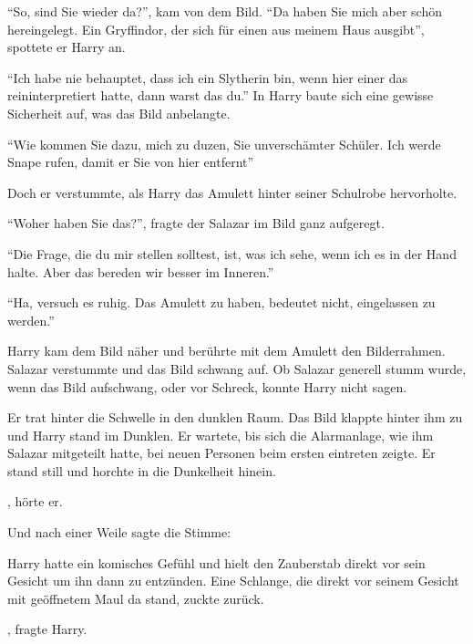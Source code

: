 \enquote{So, sind Sie wieder da?}, kam von dem Bild. \enquote{Da haben Sie mich aber schön hereingelegt. Ein Gryffindor, der sich für einen aus meinem Haus ausgibt}, spottete er Harry an.

\enquote{Ich habe nie behauptet, dass ich ein Slytherin bin, wenn hier einer das reininterpretiert hatte, dann warst das du.} In Harry baute sich eine gewisse Sicherheit auf, was das Bild anbelangte.

\enquote{Wie kommen Sie dazu, mich zu duzen, Sie unverschämter Schüler. Ich werde Snape rufen, damit er Sie von hier entfernt\abs}

Doch er verstummte, als Harry das Amulett hinter seiner Schulrobe hervorholte.

\enquote{Woher haben Sie das?}, fragte der Salazar im Bild ganz aufgeregt.

\enquote{Die Frage, die du mir stellen solltest, ist, was ich sehe, wenn ich es in der Hand halte. Aber das bereden wir besser im Inneren.}

\enquote{Ha, versuch es ruhig. Das Amulett zu haben, bedeutet nicht, eingelassen zu werden.}

Harry kam dem Bild näher und berührte mit dem Amulett den Bilderrahmen. Salazar verstummte und das Bild schwang auf. Ob Salazar generell stumm wurde, wenn das Bild aufschwang, oder vor Schreck, konnte Harry nicht sagen.

Er trat hinter die Schwelle in den dunklen Raum. Das Bild klappte hinter ihm zu und Harry stand im Dunklen. Er wartete, bis sich die Alarmanlage, wie ihm Salazar mitgeteilt hatte, bei neuen Personen beim ersten eintreten zeigte. Er stand still und horchte in die Dunkelheit hinein.

, hörte er.


 Und nach einer Weile sagte die Stimme: 

Harry hatte ein komisches Gefühl und hielt den Zauberstab direkt vor sein Gesicht um ihn dann zu entzünden. Eine Schlange, die direkt vor seinem Gesicht mit geöffnetem Maul da stand, zuckte zurück.

, fragte Harry.

